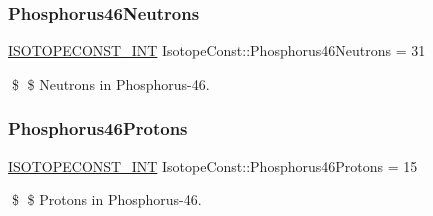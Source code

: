 \subsubsection{\texorpdfstring{Phosphorus46\+Neutrons}{Phosphorus46Neutrons}}
{\footnotesize\ttfamily \mbox{\hyperlink{group___isotope_const-_macros_ga5f18360b3e99483a35c32d789e62621c}{I\+S\+O\+T\+O\+P\+E\+C\+O\+N\+S\+T\+\_\+\+I\+NT}} Isotope\+Const\+::\+Phosphorus46\+Neutrons = 31}

\$ \$ Neutrons in Phosphorus-\/46. \mbox{\label{group___isotope_const-_phosphorus-_p46_gaabea8e31d0f57a6ed972dcb1052a4b6a}} 
\subsubsection{\texorpdfstring{Phosphorus46\+Protons}{Phosphorus46Protons}}
{\footnotesize\ttfamily \mbox{\hyperlink{group___isotope_const-_macros_ga5f18360b3e99483a35c32d789e62621c}{I\+S\+O\+T\+O\+P\+E\+C\+O\+N\+S\+T\+\_\+\+I\+NT}} Isotope\+Const\+::\+Phosphorus46\+Protons = 15}

\$ \$ Protons in Phosphorus-\/46. 